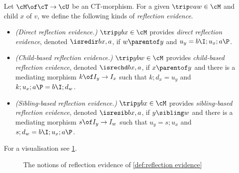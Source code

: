 \begin{definition}\label{def:reflection evidence}
Let $\cM\of \cT\to\cU$ be an CT-morphism. For a given $\trip vaw\in\cM$ and child $x$ of $v$, we define the following kinds of \emph{reflection evidence}.
\begin{itemize}[topsep=\smallskipamount]
\item \emph{(Direct reflection evidence.)} $\trip ybx\in\cM$ provides \emph{direct reflection evidence}, denoted $\isredir b{x,a}$, if $w\parentof y$ and $u_y=b\I;u_x;a\P$.
\item \emph{(Child-based reflection evidence.)} $\trip ybw\in\cM$ provides \emph{child-based reflection evidence}, denoted $\isrechd b{x,a}$, if $x\parentof y$ and there is a mediating morphism $k\of I_y\to I_x$ such that $k;d_x=u_y$ and $k;u_x;a\P=b\I;d_w$.
\item \emph{(Sibling-based reflection evidence.)} $\trip ybx\in\cM$ provides \emph{sibling-based reflection evidence}, denoted $\isresib b{x,a}$, if $y\sibling w$ and there is a mediating morphism $s\of I_y\to I_w$ such that $u_y=s;u_x$ and $s;d_w=b\I;u_x;a\P$.
\end{itemize}
\end{definition}
%
For a visualisation see \cref{fig:reflection evidence}.
%
\begin{figure}
	
	\caption{The notions of reflection evidence of \cref{def:reflection evidence}}
	\label{fig:reflection evidence}
\end{figure}

